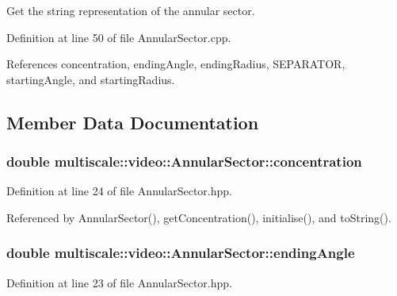 Get the string representation of the annular sector. 



Definition at line 50 of file Annular\-Sector.\-cpp.



References concentration, ending\-Angle, ending\-Radius, S\-E\-P\-A\-R\-A\-T\-O\-R, starting\-Angle, and starting\-Radius.



\subsection{Member Data Documentation}
\hypertarget{classmultiscale_1_1video_1_1AnnularSector_a7f6a1e7618c9e2a10e35efb5740395b1}{
\subsubsection[{concentration}]{\setlength{\rightskip}{0pt plus 5cm}double multiscale\-::video\-::\-Annular\-Sector\-::concentration\hspace{0.3cm}{\ttfamily [private]}}}\label{classmultiscale_1_1video_1_1AnnularSector_a7f6a1e7618c9e2a10e35efb5740395b1}


Definition at line 24 of file Annular\-Sector.\-hpp.



Referenced by Annular\-Sector(), get\-Concentration(), initialise(), and to\-String().

\hypertarget{classmultiscale_1_1video_1_1AnnularSector_a0aebd11072dbefe42196d6bda2e4318d}{
\subsubsection[{ending\-Angle}]{\setlength{\rightskip}{0pt plus 5cm}double multiscale\-::video\-::\-Annular\-Sector\-::ending\-Angle\hspace{0.3cm}{\ttfamily [private]}}}\label{classmultiscale_1_1video_1_1AnnularSector_a0aebd11072dbefe42196d6bda2e4318d}


Definition at line 23 of file Annular\-Sector.\-hpp.



